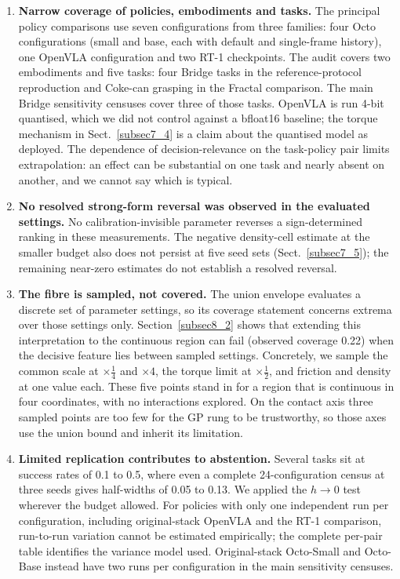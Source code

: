 \documentclass[pdflatex,iicol,sn-apa]{sn-jnl}
\theoremstyle{remark}
\begin{document}
\begin{enumerate}
\item \textbf{Narrow coverage of policies, embodiments and tasks.} The principal policy comparisons
use seven configurations from three families: four Octo configurations (small and base, each with
default and single-frame history), one OpenVLA configuration and two RT-1 checkpoints. The audit
covers two embodiments and five tasks: four Bridge tasks in the reference-protocol reproduction
and Coke-can grasping in the Fractal comparison. The main Bridge sensitivity censuses cover three of
those tasks. OpenVLA is run 4-bit quantised, which we did not control against a bfloat16 baseline; the
torque mechanism in Sect.~\ref{subsec7_4} is a claim about the quantised model as deployed. The
dependence of decision-relevance on the task-policy pair limits extrapolation: an effect can be
substantial on one task and nearly absent on another, and
we cannot say which is typical.

\item \textbf{No resolved strong-form reversal was observed in the evaluated settings.} No
calibration-invisible parameter reverses a sign-determined ranking in these measurements. The
negative density-cell estimate at the smaller budget also does not persist at five seed sets
(Sect.~\ref{subsec7_5}); the remaining near-zero estimates do not establish a resolved reversal.

\item \textbf{The fibre is sampled, not covered.} The union envelope evaluates a discrete set of
parameter settings, so its coverage statement concerns extrema over those settings only.
Section~\ref{subsec8_2} shows that extending this interpretation to the continuous region can fail
(observed coverage 0.22) when the decisive feature lies between sampled
settings. Concretely, we sample the common scale at $\times\tfrac14$ and $\times 4$, the torque
limit at $\times\tfrac12$, and friction and density at one value each. These five points stand in
for a region that is continuous in four coordinates, with no interactions explored. On the contact
axis three sampled points are too few for the GP rung to be trustworthy, so those axes use the union
bound and inherit its limitation.

\item \textbf{Limited replication contributes to abstention.}
Several tasks sit at success rates of 0.1 to 0.5, where even a complete 24-configuration census at
three seeds gives half-widths of 0.05 to 0.13. We applied the $h \to 0$ test wherever the budget
allowed. For policies with only one independent run per configuration, including original-stack
OpenVLA and the RT-1 comparison, run-to-run variation cannot be estimated empirically; the
complete per-pair table identifies the variance model used. Original-stack Octo-Small and
Octo-Base instead have two runs per configuration in the main sensitivity censuses.


\end{enumerate}
\end{document}
